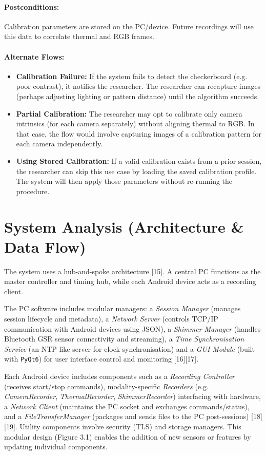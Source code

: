 \paragraph{Postconditions:} Calibration parameters are stored on the PC/device. Future recordings will use this data to correlate thermal and RGB frames.

\paragraph{Alternate Flows:}
\begin{itemize}
    \item \textbf{Calibration Failure:} If the system fails to detect the checkerboard (e.g. poor contrast), it notifies the researcher. The researcher can recapture images (perhaps adjusting lighting or pattern distance) until the algorithm succeeds.
    \item \textbf{Partial Calibration:} The researcher may opt to calibrate only camera intrinsics (for each camera separately) without aligning thermal to RGB. In that case, the flow would involve capturing images of a calibration pattern for each camera independently.
    \item \textbf{Using Stored Calibration:} If a valid calibration exists from a prior session, the researcher can skip this use case by loading the saved calibration profile. The system will then apply those parameters without re-running the procedure.
\end{itemize}


\section{System Analysis (Architecture \& Data Flow)}

The system uses a hub-and-spoke architecture [15]. A central PC functions as the master controller and timing hub, while each Android device acts as a recording client.

The PC software includes modular managers: a \textit{Session Manager} (manages session lifecycle and metadata), a \textit{Network Server} (controls TCP/IP communication with Android devices using JSON), a \textit{Shimmer Manager} (handles Bluetooth GSR sensor connectivity and streaming), a \textit{Time Synchronisation Service} (an NTP-like server for clock synchronisation) and a \textit{GUI Module} (built with \texttt{PyQt6}) for user interface control and monitoring [16][17].

Each Android device includes components such as a \textit{Recording Controller} (receives start/stop commands), modality-specific \textit{Recorders} (e.g. \textit{CameraRecorder}, \textit{ThermalRecorder}, \textit{ShimmerRecorder}) interfacing with hardware, a \textit{Network Client} (maintains the PC socket and exchanges commands/status), and a \textit{FileTransferManager} (packages and sends files to the PC post-sessions) [18][19]. Utility components involve security (TLS) and storage managers. This modular design (Figure 3.1) enables the addition of new sensors or features by updating individual components.

